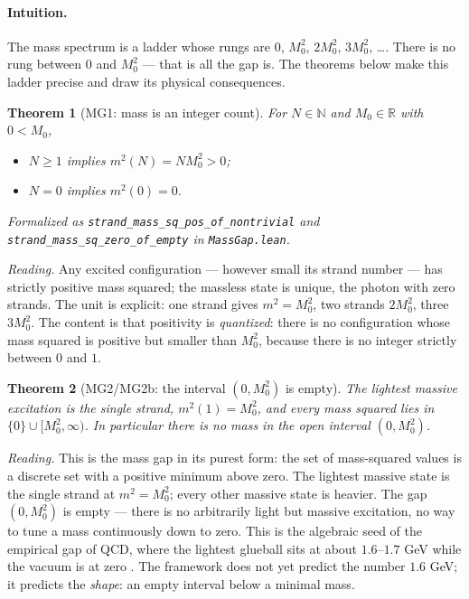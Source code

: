 \documentclass[aps,prd,preprint,superscriptaddress,amsmath,amssymb]{revtex4-2}
\newtheorem{theorem}{Theorem}[section]
\begin{document}
\paragraph{Intuition.}  The mass spectrum is a ladder whose rungs
are $0$, $M_0^2$, $2M_0^2$, $3M_0^2$, \ldots.  There is no rung
between $0$ and $M_0^2$ --- that is all the gap is.  The theorems
below make this ladder precise and draw its physical consequences.

\begin{theorem}[MG1: mass is an integer count]
\label{thm:mg1}
For $N\in\mathbb{N}$ and $M_0\in\mathbb{R}$ with $0<M_0$,
\begin{itemize}
\item $N\ge1$ implies $m^2(N)=N M_0^2>0$;
\item $N=0$ implies $m^2(0)=0$.
\end{itemize}
Formalized as \texttt{strand\_mass\_sq\_pos\_of\_\allowbreak nontrivial} and
\texttt{strand\_mass\_sq\_zero\_of\_\allowbreak empty} in \texttt{MassGap.\allowbreak lean}.
\end{theorem}

\emph{Reading.}  Any excited configuration --- however small its
strand number --- has strictly positive mass squared; the massless
state is unique, the photon with zero strands.  The unit is
explicit: one strand gives $m^2=M_0^2$, two strands $2M_0^2$, three
$3M_0^2$.  The content is that positivity is \emph{quantized}: there
is no configuration whose mass squared is positive but smaller than
$M_0^2$, because there is no integer strictly between $0$ and $1$.

\begin{theorem}[MG2/MG2b: the interval $(0,M_0^2)$ is empty]
\label{thm:mg2}
The lightest massive excitation is the single strand,
$m^2(1)=M_0^2$, and every mass squared lies in
$\{0\}\cup[M_0^2,\infty)$.  In particular there is no mass in the
open interval $(0,M_0^2)$.
\end{theorem}

\emph{Reading.}  This is the mass gap in its purest form: the set of
mass-squared values is a discrete set with a positive minimum above
zero.  The lightest massive state is the single strand at
$m^2=M_0^2$; every other massive state is heavier.  The gap
$(0,M_0^2)$ is empty --- there is no arbitrarily light but massive
excitation, no way to tune a mass continuously down to zero.  This
is the algebraic seed of the empirical gap of QCD, where the lightest
glueball sits at about $1.6$--$1.7$ GeV while the vacuum is at zero
\cite{morningstar1999glueball,chen2006glueball}.  The framework does
not yet predict the number $1.6$ GeV; it predicts the \emph{shape}:
an empty interval below a minimal mass.
\end{document}
